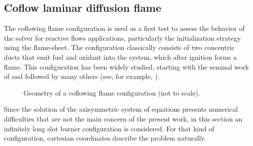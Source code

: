 \subsection{Coflow laminar diffusion flame}\label{ssec:coflowFlame}
The coflowing flame configuration is used as a first test to assess the behavior of the solver for reactive flows applications, particularly the initialization strategy using the flame-sheet. The configuration classically consists of two concentric ducts that emit fuel and oxidant into the system, which after ignition forms a flame. This configuration has been widely studied, starting with the seminal work of \textcite{burkeDiffusionFlames1928} and followed by many others (see, for example, \textcite{smookeNumericalModelingAxisymmetric1992, smookeNumericalSolutionTwoDimensional1986,braackAdaptiveFiniteElement1997}).
\begin{figure}[t]
	\centering
	\def\svgwidth{0.38\textwidth}
	\qquad\quad
	\def\svgwidth{0.35\textwidth}
	\caption{Geometry of a coflowing flame configuration (not to scale).} \label{fig:CoFlowGeometry}
\end{figure}
Since the solution of the axisymmetric system of equations presents numerical difficulties that are not the main concern of the present work, in this section an infinitely long slot burner configuration is considered. For that kind of configuration, cartesian coordinates describe the problem naturally. 
